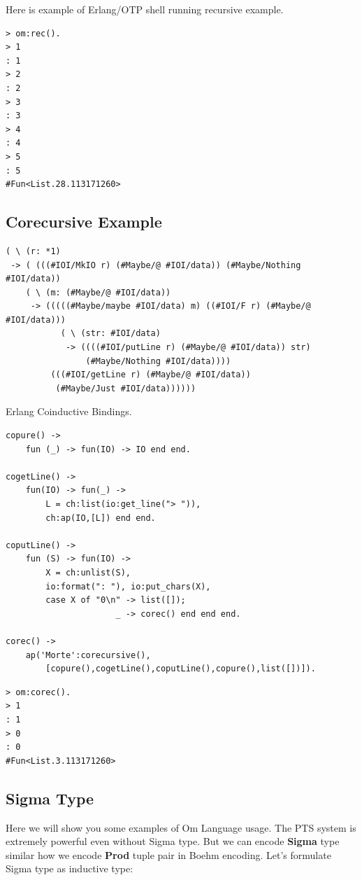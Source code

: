 \documentclass[11pt,oneside]{article}
\begin{document}
\newpage

Here is example of Erlang/OTP shell running recursive example.

\begin{lstlisting}[mathescape=true]
> om:rec().
> 1
: 1
> 2
: 2
> 3
: 3
> 4
: 4
> 5
: 5
#Fun<List.28.113171260>
\end{lstlisting}

\subsection{Corecursive Example}

\begin{lstlisting}[mathescape=true]
( \ (r: *1)
 -> ( (((#IOI/MkIO r) (#Maybe/@ #IOI/data)) (#Maybe/Nothing #IOI/data))
    ( \ (m: (#Maybe/@ #IOI/data))
     -> (((((#Maybe/maybe #IOI/data) m) ((#IOI/F r) (#Maybe/@ #IOI/data)))
           ( \ (str: #IOI/data)
            -> ((((#IOI/putLine r) (#Maybe/@ #IOI/data)) str)
                (#Maybe/Nothing #IOI/data))))
         (((#IOI/getLine r) (#Maybe/@ #IOI/data))
          (#Maybe/Just #IOI/data))))))
\end{lstlisting}

Erlang Coinductive Bindings.

\begin{lstlisting}[mathescape=true]
copure() ->
    fun (_) -> fun(IO) -> IO end end.

cogetLine() ->
    fun(IO) -> fun(_) ->
        L = ch:list(io:get_line("> ")),
        ch:ap(IO,[L]) end end.

coputLine() ->
    fun (S) -> fun(IO) ->
        X = ch:unlist(S),
        io:format(": "), io:put_chars(X),
        case X of "0\n" -> list([]);
                      _ -> corec() end end end.

corec() ->
    ap('Morte':corecursive(),
        [copure(),cogetLine(),coputLine(),copure(),list([])]).
\end{lstlisting}

\begin{lstlisting}[mathescape=true]
> om:corec().
> 1
: 1
> 0
: 0
#Fun<List.3.113171260>
\end{lstlisting}

\subsection{Sigma Type}

Here we will show you some examples of Om Language usage.
The PTS system is extremely powerful even without Sigma type. But
we can encode {\bf Sigma} type similar how we encode {\bf Prod}
tuple pair in Boehm encoding. Let's formulate Sigma type as inductive type:
\end{document}

